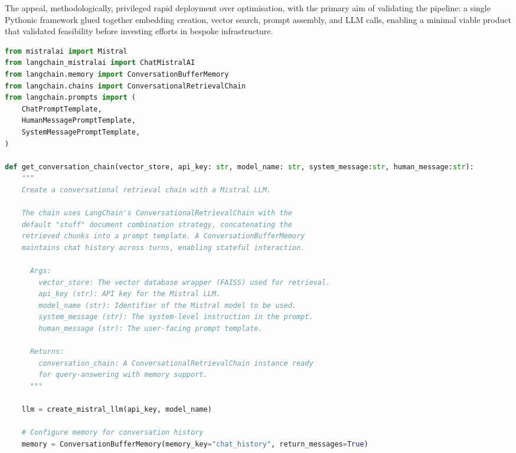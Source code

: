 \begin{spacing}{1.5}
The appeal, methodologically, privileged rapid deployment over optimisation, with the primary aim of validating the pipeline: a single Pythonic framework glued together embedding creation, vector search, prompt assembly, and LLM calls, enabling a minimal viable product that validated feasibility before investing efforts in bespoke infrastructure.


\begin{lstlisting}[language=Python, 
                  breaklines=true,
                  frame=none, 
                  showspaces=false,
                  showstringspaces=false,
                  showtabs=false,
                  caption={Usage example of the stuff method from LangChain.}, 
                  captionpos=b, 
                  label={lst:stuff-method},
                  xleftmargin=0.05\textwidth,
                  xrightmargin=0\textwidth]
from mistralai import Mistral
from langchain_mistralai import ChatMistralAI
from langchain.memory import ConversationBufferMemory
from langchain.chains import ConversationalRetrievalChain
from langchain.prompts import (
    ChatPromptTemplate,
    HumanMessagePromptTemplate,
    SystemMessagePromptTemplate,
)

def get_conversation_chain(vector_store, api_key: str, model_name: str, system_message:str, human_message:str):
    """
    Create a conversational retrieval chain with a Mistral LLM.

    The chain uses LangChain's ConversationalRetrievalChain with the 
    default "stuff" document combination strategy, concatenating the 
    retrieved chunks into a prompt template. A ConversationBufferMemory 
    maintains chat history across turns, enabling stateful interaction.

      Args:
        vector_store: The vector database wrapper (FAISS) used for retrieval.
        api_key (str): API key for the Mistral LLM.
        model_name (str): Identifier of the Mistral model to be used.
        system_message (str): The system-level instruction in the prompt.
        human_message (str): The user-facing prompt template.

      Returns:
        conversation_chain: A ConversationalRetrievalChain instance ready 
        for query-answering with memory support.
      """

    llm = create_mistral_llm(api_key, model_name)
    
    # Configure memory for conversation history
    memory = ConversationBufferMemory(memory_key="chat_history", return_messages=True)


\end{lstlisting}
\end{spacing}

